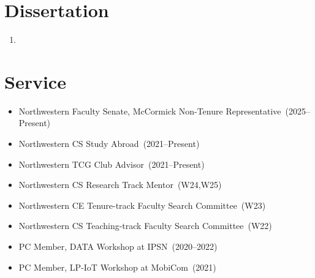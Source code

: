 \documentclass{article}
\begin{document}
\section*{Dissertation}
\vspace{-6pt}
\begin{enumerate}
  \item {}
\end{enumerate}



\section*{Service}
\vspace{-6pt}
\begin{itemize}
  \item[] Northwestern Faculty Senate, McCormick Non-Tenure Representative~(2025--Present)
  \item[] Northwestern CS Study Abroad~(2021--Present)
  \item[] Northwestern TCG Club Advisor~(2021--Present)
  \item[] Northwestern CS Research Track Mentor~(W24,W25)
  \item[] Northwestern CE Tenure-track Faculty Search Committee~(W23)
  \item[] Northwestern CS Teaching-track Faculty Search Committee~(W22)
  \item[] PC Member, DATA Workshop at IPSN~(2020--2022)
  \item[] PC Member, LP-IoT Workshop at MobiCom~(2021)
\end{itemize}
\end{document}
